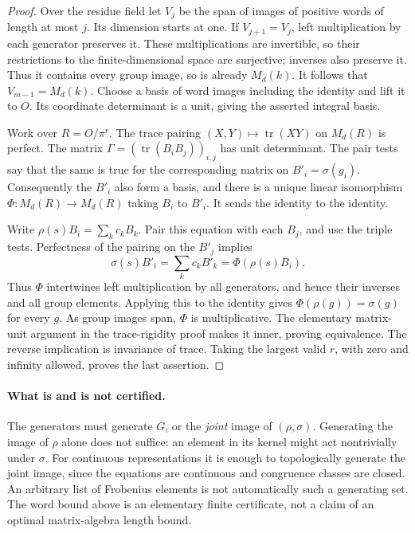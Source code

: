 \begin{proof}
Over the residue field let \(V_j\) be the span of images of positive
words of length at most \(j\). Its dimension starts at one. If
\(V_{j+1}=V_j\), left multiplication by each generator preserves it.
These multiplications are invertible, so their restrictions to the
finite-dimensional space are surjective; inverses also preserve it.
Thus it contains every group image, so is already \(M_d(k)\).
It follows that \(V_{m-1}=M_d(k)\). Choose a basis of word images
including the identity and lift it to \(O\). Its coordinate determinant
is a unit, giving the asserted integral basis.

Work over \(R=O/\pi^r\). The trace pairing
\((X,Y)\mapsto\operatorname{tr}(XY)\) on \(M_d(R)\) is perfect.
The matrix \(\Gamma=(\operatorname{tr}(B_iB_j))_{i,j}\) has unit
determinant. The pair tests say that the same is true for the corresponding
matrix on \(B'_i=\sigma(g_i)\). Consequently the \(B'_i\) also form a
basis, and there is a unique linear isomorphism
\(\Phi:M_d(R)\to M_d(R)\) taking \(B_i\) to \(B'_i\).
It sends the identity to the identity.

Write \(\rho(s)B_i=\sum_k c_kB_k\).
Pair this equation with each \(B_j\), and use the triple tests. Perfectness
of the pairing on the \(B'_j\) implies
\[
 \sigma(s)B'_i=\sum_k c_kB'_k
              =\Phi(\rho(s)B_i).
\]
Thus \(\Phi\) intertwines left multiplication by all generators, and hence
their inverses and all group elements. Applying this to the identity
gives \(\Phi(\rho(g))=\sigma(g)\) for every \(g\).
As group images span, \(\Phi\) is multiplicative. The elementary
matrix-unit argument in the trace-rigidity proof makes it inner, proving
equivalence. The reverse implication is invariance of trace.
Taking the largest valid \(r\), with zero and infinity allowed, proves
the last assertion.
\end{proof}

\paragraph{What is and is not certified.}
The generators must generate \(G\), or the \emph{joint} image of
\((\rho,\sigma)\). Generating the image of \(\rho\) alone does not
suffice: an element in its kernel might act nontrivially under \(\sigma\).
For continuous representations it is enough to topologically generate
the joint image, since the equations are continuous and congruence classes
are closed. An arbitrary list of Frobenius elements is not automatically
such a generating set. The word bound above is an elementary finite
certificate, not a claim of an optimal matrix-algebra length bound.

